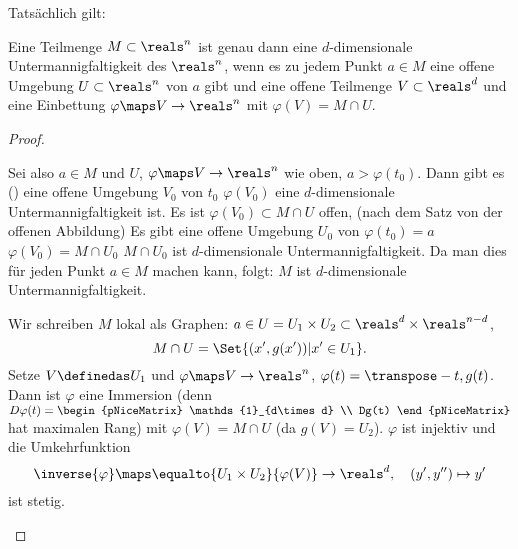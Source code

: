 Tatsächlich gilt:
\begin{satz}\label{mannigfaltigkeiten_sind_parametisierbar}
  Eine Teilmenge \( M\subset \reals^n \) ist genau dann eine \( d \)-dimensionale Untermannigfaltigkeit des \( \reals^n \), wenn es zu jedem Punkt \( a\in M \) eine offene Umgebung \( U\subset \reals^n \) von \( a \) gibt und eine offene Teilmenge \( V\subset \reals^d \) und eine Einbettung \( \varphi\maps V\to \reals^n \) mit \( \varphi(V)=M\cap U \).
\end{satz}
\begin{proof}
  \begin{proofdescription}
    \item[\rueck] Sei also \( a\in M \) und \( U \), \( \varphi\maps V\to \reals^n \) wie oben, \( a>\varphi(t_0) \). Dann gibt es () eine offene Umgebung \( V_0 \) von \( t_0 \) \sd \( \varphi(V_0) \) eine \( d \)-dimensionale Untermannigfaltigkeit ist. Es ist \( \varphi(V_0)\subset M\cap U \) offen, (nach dem Satz von der offenen Abbildung) \timplies Es gibt eine offene Umgebung \( U_0 \) von \( \varphi(t_0)=a \) \sd \( \varphi(V_0)=M\cap U_0 \) \timplies \( M\cap U_0 \) ist \( d \)-dimensionale Untermannigfaltigkeit. Da man dies für jeden Punkt \( a\in M \) machen kann, folgt: \( M \) ist \( d \)-dimensionale Untermannigfaltigkeit.
    \item[\hin] Wir schreiben \( M \) lokal als Graphen: \( a\in U=U_1\times U_2\subset \reals^d\times\reals^{n-d} \),   
    \begin{equation*}
      M\cap U=\Set{(x',g(x'))|x'\in U_1}.
    \end{equation*}
    Setze \( V\definedas U_1 \) und \( \varphi\maps V\to \reals^n \), \( \varphi(t)=\transpose-{t,g(t)} \). Dann ist \( \varphi \) eine Immersion (denn \( D\varphi(t)=\begin{pNiceMatrix} \mathds{1}_{d\times d} \\ Dg(t) \end{pNiceMatrix} \) hat maximalen Rang) mit \( \varphi(V)=M\cap U \) (da \( g(V)=U_2 \)). \( \varphi \) ist injektiv und die Umkehrfunktion
      \begin{equation*}
        \inverse{\varphi}\maps \equalto{U_1\times U_2}{\varphi(V)}\to \reals^d,\quad (y',y'')\mapsto y'
      \end{equation*}
      ist stetig.
  \end{proofdescription}
  
\end{proof}
